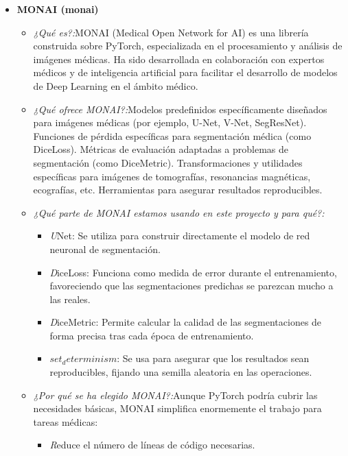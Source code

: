 \documentclass[12pt]{article}
\begin{document}
\begin{itemize}
\begin{itemize}
    \end{itemize}
    \item \textbf{ MONAI (monai)}
         \begin{itemize}
        \item \textit{¿Qué es?:}MONAI (Medical Open Network for AI) es una librería construida sobre PyTorch, especializada en el procesamiento y análisis de imágenes médicas. Ha sido desarrollada en colaboración con expertos médicos y de inteligencia artificial para facilitar el desarrollo de modelos de Deep Learning en el ámbito médico.
        \item \textit{¿Qué ofrece MONAI?:}Modelos predefinidos específicamente diseñados para imágenes médicas (por ejemplo, U-Net, V-Net, SegResNet). Funciones de pérdida específicas para segmentación médica (como DiceLoss). Métricas de evaluación adaptadas a problemas de segmentación (como DiceMetric). Transformaciones y utilidades específicas para imágenes de tomografías, resonancias magnéticas, ecografías, etc. Herramientas para asegurar resultados reproducibles.
        \end{itemize}
        \begin{itemize}
            \item \textit{¿Qué parte de MONAI estamos usando en este proyecto y para qué?:} 
                \begin{itemize}
                    \item \textit UNet: Se utiliza para construir directamente el modelo de red neuronal de segmentación.
                    \item \textit DiceLoss: Funciona como medida de error durante el entrenamiento, favoreciendo que las segmentaciones predichas se parezcan mucho a las reales.
                    \item \textit DiceMetric: Permite calcular la calidad de las segmentaciones de forma precisa tras cada época de entrenamiento.
                    \item \textit {$set_determinism$}: Se usa para asegurar que los resultados sean reproducibles, fijando una semilla aleatoria en las operaciones.
                \end{itemize}
        \item \textit{¿Por qué se ha elegido MONAI?:}Aunque PyTorch podría cubrir las necesidades básicas, MONAI simplifica enormemente el trabajo para tareas médicas:
            \begin{itemize}
                \item \textit Reduce el número de líneas de código necesarias.

\end{itemize}
\end{itemize}
\end{itemize}
\end{document}
